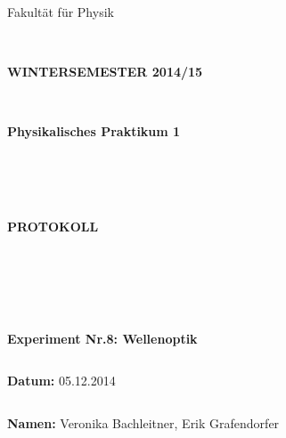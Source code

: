 \documentclass{article}
\begin{document}
\thispagestyle{empty}
			\begin{center}
			\Large{Fakultät für Physik}\\
			\end{center}
\begin{verbatim}


\end{verbatim}
			\begin{center}
			\textbf{\LARGE WINTERSEMESTER 2014/15}
			\end{center}
\begin{verbatim}


\end{verbatim}
			\begin{center}
			\textbf{\LARGE{Physikalisches Praktikum 1}}
			\end{center}
\begin{verbatim}




\end{verbatim}

			\begin{center}
			\textbf{\LARGE{PROTOKOLL}}
			\end{center}
			
\begin{verbatim}





\end{verbatim}

			\begin{flushleft}
			\textbf{\Large{Experiment Nr.8:} Wellenoptik}\\
			\LARGE{}	
			\end{flushleft}

\begin{verbatim}

\end{verbatim}	
			\begin{flushleft}
			\textbf{\Large{Datum:}} \Large{05.12.2014}
			\end{flushleft}
			
\begin{verbatim}
\end{verbatim}
		\begin{flushleft}
			\textbf{\Large{Namen:}} \Large{Veronika Bachleitner, Erik Grafendorfer}
			\end{flushleft}
\end{document}
